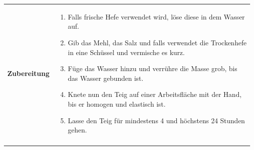 \documentclass[a4paper, 12pt]{scrbook} 								%
\numberwithin{equation}{section} 									%
\begin{document}
\begin{tabularx}{\textwidth}[t]{r|L}
			\textbf{Zubereitung}	&	\begin{enumerate}[]
											\item	Falls frische Hefe verwendet wird, löse diese in dem Wasser auf.
											\item 	Gib das Mehl, das Salz und falls verwendet die Trockenhefe in eine Schüssel und vermische es kurz.
											\item 	Füge das Wasser hinzu und verrühre die Masse grob, bis das Wasser gebunden ist.
											\item 	Knete nun den Teig auf einer Arbeitsfläche mit der Hand, bis er homogen und elastisch ist.
											\item 	Lasse den Teig für mindestens 4 und höchstens 24 Stunden gehen.
										\end{enumerate}	\\
									&	\\
		\end{tabularx}

\end{document}
